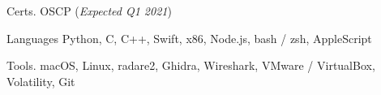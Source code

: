 
\begin{cvskills}

	\cvskill
	{Certs\hphantom{25}\color{white}.\hphantom{25}} %
	{OSCP (\textit{Expected Q1 2021})} %

	\cvskill
	{Languages} %
	{Python, C, C++, Swift, x86, Node.js, bash / zsh, AppleScript} %

	\cvskill
	{Tools\hphantom{25}\color{white}.\hphantom{25}} %
	{macOS, Linux, radare2, Ghidra, Wireshark, VMware / VirtualBox, Volatility, Git} %

\end{cvskills}
